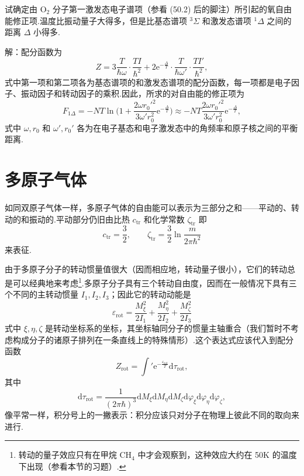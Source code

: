 \begin{xiti}

\quad 试确定由 $\mathrm{O}_2$ 分子第一激发态电子谱项（参看 (50.2) 后的脚注）所引起的氧自由能修正项.温度比振动量子大得多，但是比基态谱项 $^3\Sigma$ 和激发态谱项 $^1\Delta$ 之间的距离 $\Delta$ 小得多.

解：配分函数为
\begin{equation*}
  Z=3\frac{T}{\hbar\omega}\cdot\frac{TI}{\hbar^2}
  +2\mathrm{e}^{-\frac{\Delta}{T}}\cdot\frac{T}{\hbar\omega'}
  \cdot\frac{TI'}{\hbar^2},
\end{equation*}
式中第一项和第二项各为基态谱项的和激发态谱项的配分函数，每一项都是电子因子、振动因子和转动因子的乘积.因此，所求的对自由能的修正项为
\begin{equation*}
  F_{1\Delta}=-NT\ln\Big(1+\frac{2\omega r_0'^2}{3\omega'r_0^2}
  \mathrm{e}^{-\frac{\Delta}{T}}\Big)
  \approx-NT\frac{2\omega r_0'^2}{3\omega'r_0^2}
  \mathrm{e}^{-\frac{\Delta}{T}},
\end{equation*}
式中 $\omega,r_0$ 和 $\omega',r_0'$ 各为在电子基态和电子激发态中的角频率和原子核之间的平衡距离.

\end{xiti}

\section{多原子气体}

如同双原子气体一样，多原子气体的自由能可以表示为三部分之和——平动的、转动的和振动的.平动部分仍旧由比热 $c_{\mathrm{tr}}$ 和化学常数 $\zeta_{\mathrm{tr}}$ 即
\begin{equation}
  c_{\mathrm{tr}}=\frac{3}{2},\qquad
  \zeta_{\mathrm{tr}}=\frac{3}{2}\ln\frac{m}{2\pi\hbar^2}
\end{equation}
来表征.

由于多原子分子的转动惯量值很大（因而相应地，转动量子很小），它们的转动总是可以经典地来考虑\footnote{转动的量子效应只有在甲烷 $\mathrm{CH}_4$ 中才会观察到，这种效应大约在 50K 的温度下出现（参看本节的习题）.}.多原子分子具有三个转动自由度，因而在一般情况下具有三个不同的主转动惯量 $I_1,I_2,I_3$；因此它的转动动能是
\begin{equation}
  \varepsilon_{\mathrm{rot}}=\frac{M_{\xi}^2}{2I_1}
  +\frac{M_{\eta}^2}{2I_2}+\frac{M_{\zeta}^2}{2I_3}
\end{equation}
式中 $\xi,\eta,\zeta$ 是转动坐标系的坐标，其坐标轴同分子的惯量主轴重合（我们暂时不考虑构成分子的诸原子排列在一条直线上的特殊情形）.这个表达式应该代入到配分函数
\begin{equation}
  Z_{\mathrm{rot}}=\int{}'\mathrm{e}^{-\frac{\varepsilon_{\mathrm{rot}}}{T}}\mathrm{d}\tau_{\mathrm{rot}},
\end{equation}
其中
\begin{equation*}
  \mathrm{d}\tau_{\mathrm{rot}}
  =\frac{1}{(2\pi\hbar)^3}\mathrm{d}M_{\xi}\mathrm{d}M_{\eta}\mathrm{d}M_{\zeta}
  \mathrm{d}\varphi_{\xi}\mathrm{d}\varphi_{\eta}\mathrm{d}\varphi_{\zeta},
\end{equation*}
像平常一样，积分号上的一撇表示：积分应该只对分子在物理上彼此不同的取向来进行.

